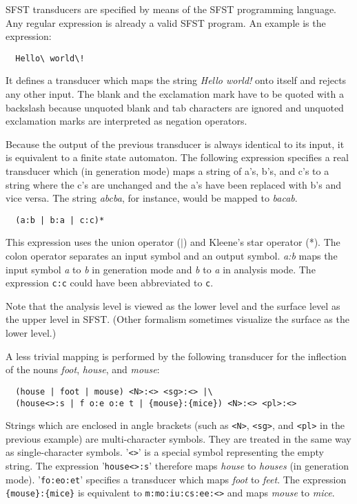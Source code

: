 \documentclass{article}
\begin{document}
SFST transducers are specified by means of the SFST programming
language. Any regular expression is already a valid SFST program. An
example is the expression:
\begin{verbatim}
  Hello\ world\!
\end{verbatim}
It defines a transducer which maps the string \emph{Hello world!} onto
itself and rejects any other input. The blank and the exclamation
mark have to be quoted with a backslash because unquoted blank and tab
characters are ignored and unquoted exclamation marks are interpreted
as negation operators.

Because the output of the previous transducer is always identical to
its input, it is equivalent to a finite state automaton. The following
expression specifies a real transducer which (in generation mode) maps
a string of a's, b's, and c's to a string where the c's are unchanged
and the a's have been replaced with b's and vice versa. The string
\emph{abcba}, for instance, would be mapped to \emph{bacab}.
\begin{verbatim}
  (a:b | b:a | c:c)*
\end{verbatim}
This expression uses the union operator ($|$) and Kleene's star
operator (*). The colon operator separates an input symbol and an
output symbol. \emph{a:b} maps the input symbol \emph{a} to \emph{b}
in generation mode and \emph{b} to \emph{a} in analysis mode. The
expression \verb#c:c# could have been abbreviated to \verb#c#.

Note that the analysis level is viewed as the lower level and the
surface level as the upper level in SFST. (Other formalism sometimes
visualize the surface as the lower level.)

A less trivial mapping is performed by the following transducer for
the inflection of the nouns \emph{foot}, \emph{house}, and
\emph{mouse}:
\begin{verbatim}
  (house | foot | mouse) <N>:<> <sg>:<> |\
  (house<>:s | f o:e o:e t | {mouse}:{mice}) <N>:<> <pl>:<>
\end{verbatim}

Strings which are enclosed in angle brackets (such as \verb#<N>#,
\verb#<sg>#, and \verb#<pl># in the previous example) are
multi-character symbols. They are treated in the same way as
single-character symbols. '\verb#<>#' is a special symbol representing
the empty string. The expression '\verb#house<>:s#' therefore maps
\emph{house} to \emph{houses} (in generation mode). '\verb#fo:eo:et#'
specifies a transducer which maps \emph{foot} to \emph{feet}. The
expression \verb#{mouse}:{mice}# is equivalent to
\verb#m:mo:iu:cs:ee:<># and maps \emph{mouse} to \emph{mice}.
\end{document}
